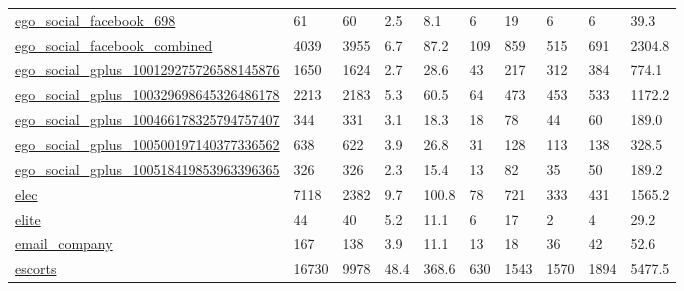 \begin{longtable}{llllllllll}
 \href{http://snap.stanford.edu/data/egonets-Facebook.html}{ego\_social\_facebook\_698}                                        & 61         & 60    & 2.5    & 8.1    & 6     & 19     & 6      & 6      & 39.3    \\
 \href{http://snap.stanford.edu/data/egonets-Facebook.html}{ego\_social\_facebook\_combined}                                   & 4039       & 3955  & 6.7    & 87.2   & 109   & 859    & 515    & 691    & 2304.8  \\
 \href{http://snap.stanford.edu/data/egonets-Facebook.html}{ego\_social\_gplus\_100129275726588145876}                         & 1650       & 1624  & 2.7    & 28.6   & 43    & 217    & 312    & 384    & 774.1   \\
 \href{http://snap.stanford.edu/data/egonets-Facebook.html}{ego\_social\_gplus\_100329698645326486178}                         & 2213       & 2183  & 5.3    & 60.5   & 64    & 473    & 453    & 533    & 1172.2  \\
 \href{http://snap.stanford.edu/data/egonets-Facebook.html}{ego\_social\_gplus\_100466178325794757407}                         & 344        & 331   & 3.1    & 18.3   & 18    & 78     & 44     & 60     & 189.0   \\
 \href{http://snap.stanford.edu/data/egonets-Facebook.html}{ego\_social\_gplus\_100500197140377336562}                         & 638        & 622   & 3.9    & 26.8   & 31    & 128    & 113    & 138    & 328.5   \\
 \href{http://snap.stanford.edu/data/egonets-Facebook.html}{ego\_social\_gplus\_100518419853963396365}                         & 326        & 326   & 2.3    & 15.4   & 13    & 82     & 35     & 50     & 189.2   \\
 \href{http://konect.cc/networks/elec}{elec}                                                                                & 7118       & 2382  & 9.7    & 100.8  & 78    & 721    & 333    & 431    & 1565.2  \\
 \href{http://konect.cc/networks/brunson_corporate-leadership}{elite}                                                       & 44         & 40    & 5.2    & 11.1   & 6     & 17     & 2      & 4      & 29.2    \\
 \href{http://konect.cc/networks/radoslaw_email}{email\_company}                                                             & 167        & 138   & 3.9    & 11.1   & 13    & 18     & 36     & 42     & 52.6    \\
 \href{https://doi.org/10.1371/journal.pcbi.1001109}{escorts}                                                               & 16730      & 9978  & 48.4   & 368.6  & 630   & 1543   & 1570   & 1894   & 5477.5  \\

\end{longtable}
